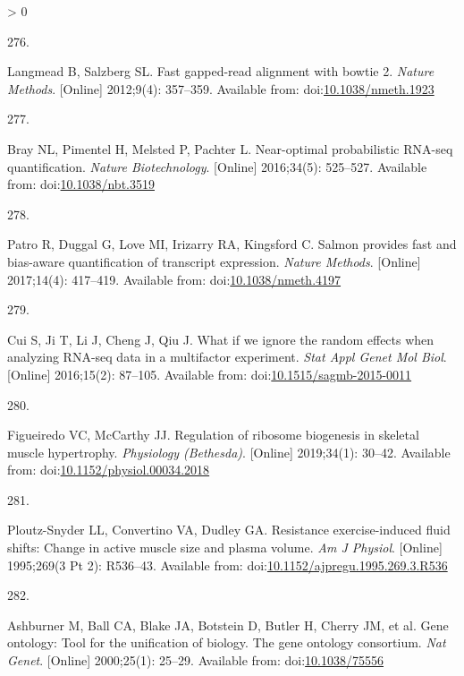 \documentclass[twoside,10pt]{gihclass} %
\newlength{\cslhangindent}
\newlength{\csllabelwidth}
\newenvironment{CSLReferences}[3] %
 {%
  \setlength{\parindent}{0pt}
  \ifodd #1 \everypar{\setlength{\hangindent}{\cslhangindent}}\ignorespaces\fi
  \ifnum #2 > 0
  \setlength{\parskip}{#2\baselineskip}
  \fi
 }%
 {}
\newcommand{\CSLLeftMargin}[1]{\parbox[t]{\maxof{\widthof{#1}}{\csllabelwidth}}{#1}}
\newcommand{\CSLRightInline}[1]{\parbox[t]{\linewidth}{#1}}
\begin{document}
\begin{CSLReferences}{0}{0}
\leavevmode\hypertarget{ref-RN2388}{}%
\CSLLeftMargin{276. }
\CSLRightInline{Langmead B, Salzberg SL. Fast gapped-read alignment with bowtie 2. \emph{Nature Methods}. {[}Online{]} 2012;9(4): 357--359. Available from: doi:\href{https://doi.org/10.1038/nmeth.1923}{10.1038/nmeth.1923}}

\leavevmode\hypertarget{ref-RN2389}{}%
\CSLLeftMargin{277. }
\CSLRightInline{Bray NL, Pimentel H, Melsted P, Pachter L. Near-optimal probabilistic RNA-seq quantification. \emph{Nature Biotechnology}. {[}Online{]} 2016;34(5): 525--527. Available from: doi:\href{https://doi.org/10.1038/nbt.3519}{10.1038/nbt.3519}}

\leavevmode\hypertarget{ref-RN2390}{}%
\CSLLeftMargin{278. }
\CSLRightInline{Patro R, Duggal G, Love MI, Irizarry RA, Kingsford C. Salmon provides fast and bias-aware quantification of transcript expression. \emph{Nature Methods}. {[}Online{]} 2017;14(4): 417--419. Available from: doi:\href{https://doi.org/10.1038/nmeth.4197}{10.1038/nmeth.4197}}

\leavevmode\hypertarget{ref-RN2366}{}%
\CSLLeftMargin{279. }
\CSLRightInline{Cui S, Ji T, Li J, Cheng J, Qiu J. What if we ignore the random effects when analyzing RNA-seq data in a multifactor experiment. \emph{Stat Appl Genet Mol Biol}. {[}Online{]} 2016;15(2): 87--105. Available from: doi:\href{https://doi.org/10.1515/sagmb-2015-0011}{10.1515/sagmb-2015-0011}}

\leavevmode\hypertarget{ref-RN2142}{}%
\CSLLeftMargin{280. }
\CSLRightInline{Figueiredo VC, McCarthy JJ. Regulation of ribosome biogenesis in skeletal muscle hypertrophy. \emph{Physiology (Bethesda)}. {[}Online{]} 2019;34(1): 30--42. Available from: doi:\href{https://doi.org/10.1152/physiol.00034.2018}{10.1152/physiol.00034.2018}}

\leavevmode\hypertarget{ref-RN2270}{}%
\CSLLeftMargin{281. }
\CSLRightInline{Ploutz-Snyder LL, Convertino VA, Dudley GA. Resistance exercise-induced fluid shifts: Change in active muscle size and plasma volume. \emph{Am J Physiol}. {[}Online{]} 1995;269(3 Pt 2): R536--43. Available from: doi:\href{https://doi.org/10.1152/ajpregu.1995.269.3.R536}{10.1152/ajpregu.1995.269.3.R536}}

\leavevmode\hypertarget{ref-RN2889}{}%
\CSLLeftMargin{282. }
\CSLRightInline{Ashburner M, Ball CA, Blake JA, Botstein D, Butler H, Cherry JM, et al. Gene ontology: Tool for the unification of biology. The gene ontology consortium. \emph{Nat Genet}. {[}Online{]} 2000;25(1): 25--29. Available from: doi:\href{https://doi.org/10.1038/75556}{10.1038/75556}}


\end{CSLReferences}
\end{document}
